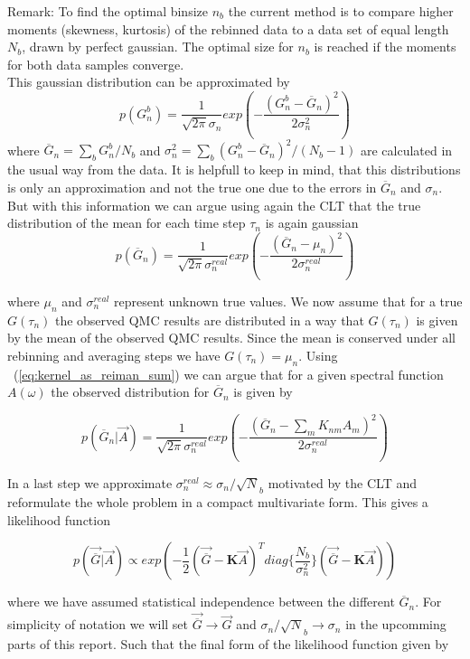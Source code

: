 Remark: To find the optimal binsize $n_b$ the current method is to compare higher moments (skewness, kurtosis) of the rebinned 
data to a data set of equal length $N_b$, drawn by perfect gaussian. The optimal size for $n_b$ is reached if the
moments for both data samples converge.\\

\noindent This gaussian distribution can be approximated by \[ p(G_n^b) = \frac{1}{\sqrt{2 \pi} \sigma_n} exp(-\frac{(G_n^b - \overline{G}_n)^2}{2 \sigma_n^2}) \]
\noindent where $\overline{G}_n = \sum_{b} G_n^b /N_b$ and $\sigma_n^2 = \sum_b (G_n^b - \overline{G}_n)^2 / (N_b -1)$ are calculated
in the usual way from the data. It is helpfull to keep in mind, that this distributions is only an approximation and not the 
true one due to the errors in $\overline{G}_n$ and $\sigma_n$.\\
But with this information we can argue using again the CLT that the true distribution of the mean for each time step $\tau_n$ is 
again gaussian 
\[ p(\overline{G}_n) = \frac{1}{\sqrt{2 \pi} \sigma_n^{real}} exp(-\frac{(\overline{G}_n - \mu_n)^2}{2 \sigma_n^{real}}) \]

where $\mu_n$ and $\sigma_n^{real}$ represent unknown true values. We now assume that for a true $G(\tau_n)$ the observed QMC 
results are distributed in a way that $G(\tau_n)$ is given by the mean of the observed QMC results. Since the mean is conserved 
under all rebinning and averaging steps we have $G(\tau_n) = \mu_n$. Using ~(\ref{eq:kernel_as_reiman_sum}) we can argue
that for a given spectral function $A(\omega)$ the observed distribution for $\overline{G}_n$ is given by 

\[ p(\overline{G}_n | \vec{A}) = \frac{1}{\sqrt{2 \pi} \sigma_n^{real}} exp(-\frac{(\overline{G}_n - \sum_m K_{nm}A_m)^2}{2 \sigma_n^{real}}) \]

\noindent In a last step we approximate $\sigma_n^{real} \approx \sigma_n/ \sqrt N_b$ motivated by the CLT and reformulate the 
whole problem in a compact multivariate form. This gives a likelihood function 

\begin{equation}
 p(\vec{\overline{G}}|\vec{A}) \propto exp \left( -\frac{1}{2} (\vec{\overline{G}}-\textbf{K}\vec{A})^T diag\{ \frac{N_b}{\sigma_n^2} \} (\vec{\overline{G}}-\textbf{K}\vec{A})  \right)
\end{equation}

\noindent where we have assumed statistical independence between the different $\overline{G}_n$. For simplicity of notation 
we will set $\vec{\overline{G}} \rightarrow \vec{G}$ and $  \sigma_n / \sqrt N_b  \rightarrow \sigma_n$ in the upcomming parts
of this report. Such that the final form of the likelihood function given by 

